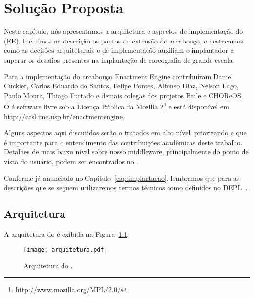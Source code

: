 \chapter{Solução Proposta}
\label{cap:solucao}


Neste capítulo, nós apresentamos a arquitetura e aspectos de implementação do \choreos \ee (EE).   
Incluímos na descrição os pontos de extensão do arcabouço, e destacamos
como as decisões arquiteturais e de implementação auxiliam o implantador
a superar os desafios presentes na implantação de coreografia de grande escala.

Para a implementação do arcabouço Enactment Engine contribuíram Daniel Cuckier, Carlos Eduardo do Santos, Felipe Pontes, Alfonso Diaz, Nelson Lago, Paulo Moura, Thiago Furtado e demais colegas dos projetos Baile e CHOReOS. O \ee é software livre 
sob a Licença Pública da Mozilla 2\footnote{\url{http://www.mozilla.org/MPL/2.0/}} 
e está disponível em \url{http://ccsl.ime.usp.br/enactmentengine}. 

Alguns aspectos aqui discutidos serão o tratados em alto nível,
priorizando o que é importante para o entendimento das contribuições
acadêmicas deste trabalho.
Detalhes de mais baixo nível sobre nosso middleware, principalmente do ponto de vista do
usuário, podem ser encontrados no \userguide.

Conforme já anunciado no Capítulo~\ref{cap:implantacao},
lembramos que para as descrições que se seguem utilizaremos
termos técnicos como definidos no DEPL~\cite{DEPL2006}.

\section{Arquitetura}

A arquitetura do \ee é exibida na Figura~\ref{fig:arquitetura}.

\begin{figure}[ht]
\centering
\texttt{[image: arquitetura.pdf]}
\caption{Arquitetura do \choreos \ee.}
\label{fig:arquitetura}
\end{figure}

